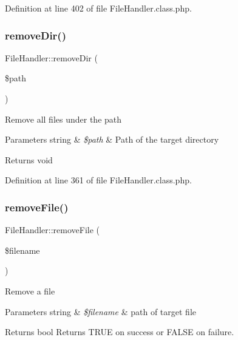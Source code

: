 Definition at line 402 of file File\+Handler.\+class.\+php.

\mbox{\label{classFileHandler_a55015d030d3773d96281b0fa4bda986e}} 
\subsubsection{\texorpdfstring{remove\+Dir()}{removeDir()}}
{\footnotesize\ttfamily File\+Handler\+::remove\+Dir (\begin{DoxyParamCaption}\item[{}]{\$path }\end{DoxyParamCaption})}

Remove all files under the path


\begin{DoxyParams}[1]{Parameters}
string & {\em \$path} & Path of the target directory \\
\hline
\end{DoxyParams}
\begin{DoxyReturn}{Returns}
void 
\end{DoxyReturn}


Definition at line 361 of file File\+Handler.\+class.\+php.

\mbox{\label{classFileHandler_aa5969f9fe0ce869fc736c4da384959e9}} 
\subsubsection{\texorpdfstring{remove\+File()}{removeFile()}}
{\footnotesize\ttfamily File\+Handler\+::remove\+File (\begin{DoxyParamCaption}\item[{}]{\$filename }\end{DoxyParamCaption})}

Remove a file


\begin{DoxyParams}[1]{Parameters}
string & {\em \$filename} & path of target file \\
\hline
\end{DoxyParams}
\begin{DoxyReturn}{Returns}
bool Returns T\+R\+UE on success or F\+A\+L\+SE on failure. 
\end{DoxyReturn}


